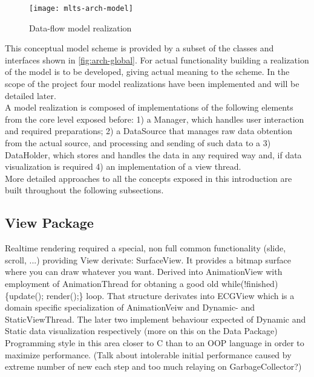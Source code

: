 		\begin{figure}[h]
		\texttt{[image: mlts-arch-model]}
		\centering
		\caption{Data-flow model realization}
		\label{fig:arch-model}
		\end{figure}

		This conceptual model  scheme is provided by a subset of the classes and interfaces shown in \autoref{fig:arch-global}. For actual functionality building a realization of the model is to be developed, giving actual meaning to the scheme. In the scope of the project four model realizations have been implemented and will be detailed later.\\

		A model realization is composed of implementations of the following elements from the core level exposed before: 1) a Manager, which handles user interaction and required preparations; 2) a DataSource that manages raw data obtention from the actual source, and processing and sending of such data to a 3) DataHolder, which stores and handles the data in any required way and, if data visualization is required 4) an implementation of a view thread.\\

		More detailed approaches to all the concepts exposed in this introduction are built throughout the following subsections.

		\subsection{View Package}
		Realtime rendering required a special, non full common functionality (slide, scroll, ...) providing View derivate: SurfaceView. It provides a bitmap surface where you can draw whatever you want. Derived into AnimationView with employment of AnimationThread for obtaning a good old while(!finished) \{update(); render();\} loop.
		That structure derivates into ECGView which is a domain specific specialization of AnimationVeiw and Dynamic- and StaticViewThread. The later two implement behaviour expected of Dynamic and Static data visualization respectively (more on this on the Data Package)
		Programming style in this area closer to C than to an OOP language in order to maximize performance. (Talk about intolerable initial performance caused by extreme number of new each step and too much relaying on GarbageCollector?)
		
